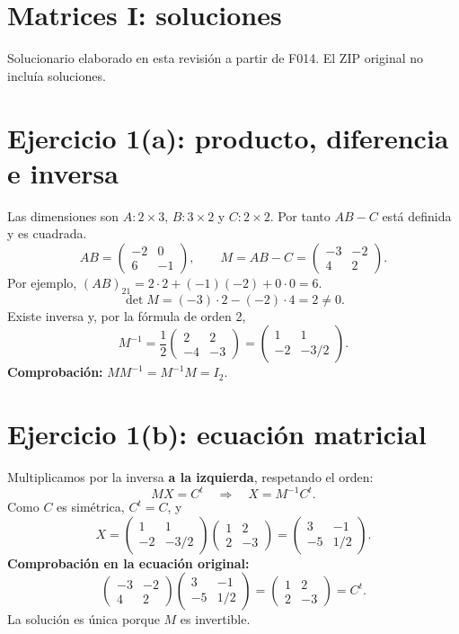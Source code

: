 \documentclass[11pt]{article}
\begin{document}
\section*{Matrices I: soluciones}
Solucionario elaborado en esta revisión a partir de F014. El ZIP original no incluía soluciones.
\section*{Ejercicio 1(a): producto, diferencia e inversa}
Las dimensiones son $A:2\times3$, $B:3\times2$ y $C:2\times2$. Por tanto $AB-C$ está definida y es cuadrada.
\[
AB=\begin{pmatrix}-2&0\\6&-1\end{pmatrix},\qquad
M=AB-C=\begin{pmatrix}-3&-2\\4&2\end{pmatrix}.
\]
Por ejemplo, $(AB)_{21}=2\cdot2+(-1)(-2)+0\cdot0=6$.
\[\det M=(-3)\cdot2-(-2)\cdot4=2\neq0.\]
Existe inversa y, por la fórmula de orden 2,
\[
\boxed{M^{-1}=\frac12\begin{pmatrix}2&2\\-4&-3\end{pmatrix}
=\begin{pmatrix}1&1\\-2&-3/2\end{pmatrix}}.
\]
\textbf{Comprobación:} $MM^{-1}=M^{-1}M=I_2$.
\section*{Ejercicio 1(b): ecuación matricial}
Multiplicamos por la inversa \textbf{a la izquierda}, respetando el orden:
\[MX=C^t\quad\Longrightarrow\quad X=M^{-1}C^t.\]
Como $C$ es simétrica, $C^t=C$, y
\[
X=\begin{pmatrix}1&1\\-2&-3/2\end{pmatrix}
\begin{pmatrix}1&2\\2&-3\end{pmatrix}
=\boxed{\begin{pmatrix}3&-1\\-5&1/2\end{pmatrix}}.
\]
\textbf{Comprobación en la ecuación original:}
\[
\begin{pmatrix}-3&-2\\4&2\end{pmatrix}
\begin{pmatrix}3&-1\\-5&1/2\end{pmatrix}
=\begin{pmatrix}1&2\\2&-3\end{pmatrix}=C^t.
\]
La solución es única porque $M$ es invertible.
\clearpage
\end{document}
